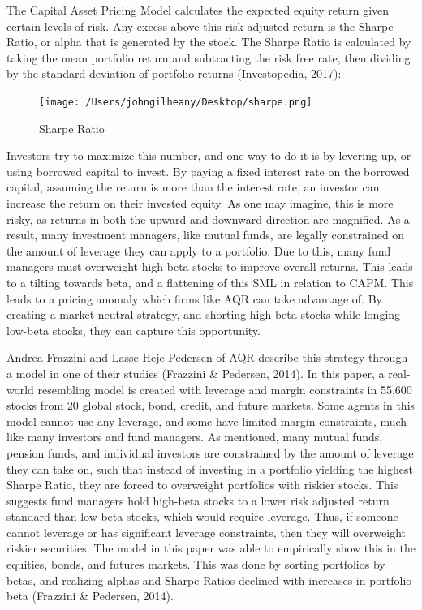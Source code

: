 \documentclass[12pt,twoside]{reedthesis}
\theoremstyle{definition}
\theoremstyle{definition}
\theoremstyle{definition}
\theoremstyle{remark}
\begin{document}
The Capital Asset Pricing Model calculates the expected equity return
given certain levels of risk. Any excess above this risk-adjusted return
is the Sharpe Ratio, or alpha that is generated by the stock. The Sharpe
Ratio is calculated by taking the mean portfolio return and subtracting
the risk free rate, then dividing by the standard deviation of portfolio
returns (Investopedia, 2017):
\begin{figure}
\centerline{\texttt{[image: /Users/johngilheany/Desktop/sharpe.png]}}
\caption{Sharpe Ratio}
\label{Sharpe}
\end{figure}
Investors try to maximize this number, and one way to do it is by
levering up, or using borrowed capital to invest. By paying a fixed
interest rate on the borrowed capital, assuming the return is more than
the interest rate, an investor can increase the return on their invested
equity. As one may imagine, this is more risky, as returns in both the
upward and downward direction are magnified. As a result, many
investment managers, like mutual funds, are legally constrained on the
amount of leverage they can apply to a portfolio. Due to this, many fund
managers must overweight high-beta stocks to improve overall returns.
This leads to a tilting towards beta, and a flattening of this SML in
relation to CAPM. This leads to a pricing anomaly which firms like AQR
can take advantage of. By creating a market neutral strategy, and
shorting high-beta stocks while longing low-beta stocks, they can
capture this opportunity.

Andrea Frazzini and Lasse Heje Pedersen of AQR describe this strategy
through a model in one of their studies (Frazzini \& Pedersen, 2014). In
this paper, a real-world resembling model is created with leverage and
margin constraints in 55,600 stocks from 20 global stock, bond, credit,
and future markets. Some agents in this model cannot use any leverage,
and some have limited margin constraints, much like many investors and
fund managers. As mentioned, many mutual funds, pension funds, and
individual investors are constrained by the amount of leverage they can
take on, such that instead of investing in a portfolio yielding the
highest Sharpe Ratio, they are forced to overweight portfolios with
riskier stocks. This suggests fund managers hold high-beta stocks to a
lower risk adjusted return standard than low-beta stocks, which would
require leverage. Thus, if someone cannot leverage or has significant
leverage constraints, then they will overweight riskier securities. The
model in this paper was able to empirically show this in the equities,
bonds, and futures markets. This was done by sorting portfolios by
betas, and realizing alphas and Sharpe Ratios declined with increases in
portfolio-beta (Frazzini \& Pedersen, 2014).
\end{document}
